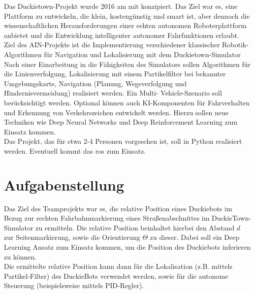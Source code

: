 Das Duckietown-Projekt wurde 2016 am \acf{mit} konzipiert. Das Ziel war es, eine Plattform zu
entwickeln, die klein, kostengünstig und \grqq smart\grqq{} ist, aber dennoch die wissenschaftlichen
Herausforderungen einer echten autonomen Roboterplattform anbietet und die Entwicklung
intelligenter autonomer Fahrfunktionen erlaubt. \cite{duckietown}\\

\noindent Ziel des AIN-Projekts ist die Implementierung verschiedener klassischer Robotik-Algorithmen
für Navigation und Lokalisierung mit dem Duckietown-Simulator\\

\noindent Nach einer Einarbeitung in die Fähigkeiten des Simulators sollen Algorithmen für die
Linienverfolgung, Lokalisierung mit einem Partikelfilter bei bekannter Umgebungskarte,
Navigation (Planung, Wegeverfolgung und Hindernisvermeidung) realisiert werden. Ein Multi-
Vehicle-Szenario soll berücksichtigt werden. Optional können auch KI-Komponenten für
Fahrverhalten und Erkennung von Verkehrszeichen entwickelt werden. Hierzu sollen neue
Techniken wie Deep Neural Networks und Deep Reinforcement Learning zum Einsatz
kommen.\\

\noindent Das Projekt, das für etwa 2-4 Personen vorgesehen ist, soll in Python realisiert werden.
Eventuell kommt das \acf{ros} zum Einsatz.

\newpage

\section{Aufgabenstellung}

Das Ziel des Teamprojekts war es, die relative Position eines Duckiebots im Bezug zur rechten Fahrbahnmarkierung eines Straßenabschnittes im DuckieTown-Simulator zu ermitteln. Die relative Position beinhaltet hierbei den Abstand $d$ zur Seitenmarkierung, sowie die Orientierung $\Theta$ zu dieser. Dabei soll ein Deep Learning Ansatz zum Einsatz kommen, um die Position des Duckiebots inferieren zu können. \\

Die ermittelte relative Position kann dann für die Lokalisation (z.B. mittels Partikel-Filter) des DuckieBots verwendet werden, sowie für die autonome Steuerung (beispielsweise mittels PID-Regler).